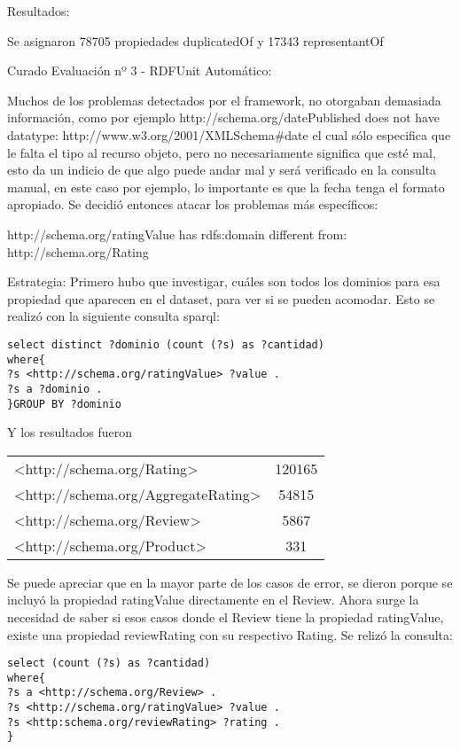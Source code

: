 Resultados:

Se asignaron 78705 propiedades duplicatedOf y 17343 representantOf

Curado Evaluación nº 3 - RDFUnit Automático:

Muchos de los problemas detectados por el framework, no otorgaban demasiada información, como por ejemplo
http://schema.org/datePublished does not have datatype: http://www.w3.org/2001/XMLSchema\#date el cual sólo especifica que le 
falta el tipo al recurso objeto, pero no necesariamente significa que esté mal, esto da un indicio de que algo puede andar mal
y será verificado en la consulta manual, en este caso por ejemplo, lo importante es que la fecha tenga el formato apropiado.
Se decidió entonces atacar los problemas más específicos:

http://schema.org/ratingValue has rdfs:domain different from: http://schema.org/Rating

Estrategia:
Primero hubo que investigar, cuáles son todos los dominios para esa propiedad que aparecen en el dataset, para ver si se pueden 
acomodar. Esto se realizó con la siguiente consulta sparql:

\begin{lstlisting}[frame=single]  
select distinct ?dominio (count (?s) as ?cantidad) 
where{
?s <http://schema.org/ratingValue> ?value .
?s a ?dominio .
}GROUP BY ?dominio
\end{lstlisting}

Y los resultados fueron

\begin{tabular}{| l | c |}
 <http://schema.org/Rating> & 120165\\
 <http://schema.org/AggregateRating> & 54815 \\
 <http://schema.org/Review> & 5867 \\
 <http://schema.org/Product> & 331 \\
\end{tabular}

Se puede apreciar que en la mayor parte de los casos de error, se dieron porque se incluyó la propiedad ratingValue directamente en 
el Review. Ahora surge la necesidad de saber si esos casos donde el Review tiene la propiedad ratingValue, existe una propiedad reviewRating 
con su respectivo Rating.
Se relizó la consulta:

\begin{lstlisting}[frame=single]  
select (count (?s) as ?cantidad) 
where{
?s a <http://schema.org/Review> . 
?s <http://schema.org/ratingValue> ?value . 
?s <http:schema.org/reviewRating> ?rating . 
}
\end{lstlisting}


